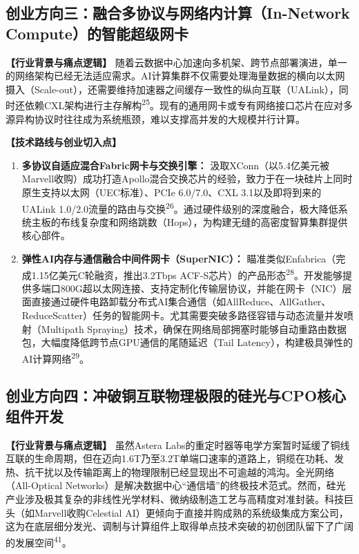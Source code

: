 \subsection{创业方向三：融合多协议与网络内计算（In-Network Compute）的智能超级网卡}

\textbf{【行业背景与痛点逻辑】} 随着云数据中心加速向多机架、跨节点部署演进，单一的网络架构已经无法适应需求。AI计算集群不仅需要处理海量数据的横向以太网摄入（Scale-out），还需要维持加速器之间缓存一致性的纵向互联（UALink），同时还依赖CXL架构进行主存解构\textsuperscript{25}。现有的通用网卡或专有网络接口芯片在应对多源异构协议时往往成为系统瓶颈，难以支撑高并发的大规模并行计算。

\textbf{【技术路线与创业切入点】}

\begin{enumerate}
  \item \textbf{多协议自适应混合Fabric网卡与交换引擎：} 汲取XConn（以5.4亿美元被Marvell收购）成功打造Apollo混合交换芯片的经验，致力于在一块硅片上同时原生支持以太网（UEC标准）、PCIe 6.0/7.0、CXL 3.1以及即将到来的UALink 1.0/2.0流量的路由与交换\textsuperscript{26}。通过硬件级别的深度融合，极大降低系统主板的布线复杂度和网络跳数（Hops），为构建无缝的高密度智算集群提供核心部件。
  \item \textbf{弹性AI内存与通信融合中间件网卡（SuperNIC）：} 瞄准类似Enfabrica（完成1.15亿美元C轮融资，推出3.2Tbps ACF-S芯片）的产品形态\textsuperscript{28}。开发能够提供多端口800G超以太网连接、支持定制化传输层协议，并能在网卡（NIC）层面直接通过硬件电路卸载分布式AI集合通信（如AllReduce、AllGather、ReduceScatter）任务的智能网卡。尤其需要突破多路径容错与动态流量并发喷射（Multipath Spraying）技术，确保在网络局部拥塞时能够自动重路由数据包，大幅度降低跨节点GPU通信的尾随延迟（Tail Latency），构建极具弹性的AI计算网络\textsuperscript{29}。
\end{enumerate}

\subsection{创业方向四：冲破铜互联物理极限的硅光与CPO核心组件开发}

\textbf{【行业背景与痛点逻辑】} 虽然Astera Labs的重定时器等电学方案暂时延缓了铜线互联的生命周期，但在迈向1.6T乃至3.2T单端口速率的道路上，铜缆在功耗、发热、抗干扰以及传输距离上的物理限制已经显现出不可逾越的鸿沟。全光网络（All-Optical Networks）是解决数据中心``通信墙''的终极技术范式。然而，硅光产业涉及极其复杂的非线性光学材料、微纳级制造工艺与高精度对准封装。科技巨头（如Marvell收购Celestial AI）更倾向于直接并购成熟的系统级集成方案公司，这为在底层细分发光、调制与计算组件上取得单点技术突破的初创团队留下了广阔的发展空间\textsuperscript{41}。

